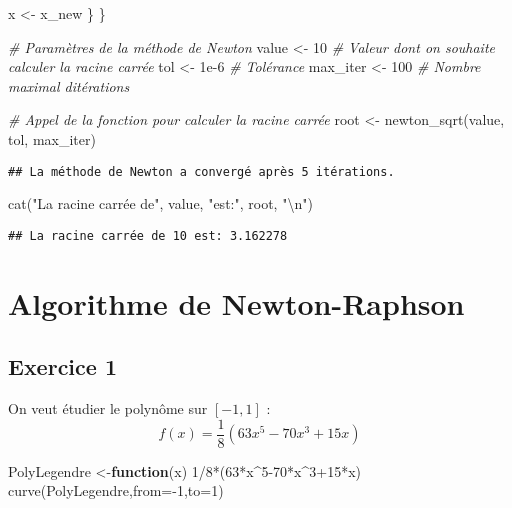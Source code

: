 \documentclass[
]{article}
\newenvironment{Shaded}{\begin{snugshade}}{\end{snugshade}}
\newcommand{\AttributeTok}[1]{\textcolor[rgb]{0.77,0.63,0.00}{#1}}
\newcommand{\CommentTok}[1]{\textcolor[rgb]{0.56,0.35,0.01}{\textit{#1}}}
\newcommand{\ControlFlowTok}[1]{\textcolor[rgb]{0.13,0.29,0.53}{\textbf{#1}}}
\newcommand{\DecValTok}[1]{\textcolor[rgb]{0.00,0.00,0.81}{#1}}
\newcommand{\FloatTok}[1]{\textcolor[rgb]{0.00,0.00,0.81}{#1}}
\newcommand{\FunctionTok}[1]{\textcolor[rgb]{0.00,0.00,0.00}{#1}}
\newcommand{\NormalTok}[1]{#1}
\newcommand{\OtherTok}[1]{\textcolor[rgb]{0.56,0.35,0.01}{#1}}
\newcommand{\SpecialCharTok}[1]{\textcolor[rgb]{0.00,0.00,0.00}{#1}}
\newcommand{\StringTok}[1]{\textcolor[rgb]{0.31,0.60,0.02}{#1}}
\begin{document}
\begin{Shaded}
\begin{Highlighting}[]
\NormalTok{    x }\OtherTok{\textless{}{-}}\NormalTok{ x\_new}
\NormalTok{  \}}
\NormalTok{\}}

\CommentTok{\# Paramètres de la méthode de Newton}
\NormalTok{value }\OtherTok{\textless{}{-}} \DecValTok{10}  \CommentTok{\# Valeur dont on souhaite calculer la racine carrée}
\NormalTok{tol }\OtherTok{\textless{}{-}} \FloatTok{1e{-}6}  \CommentTok{\# Tolérance}
\NormalTok{max\_iter }\OtherTok{\textless{}{-}} \DecValTok{100}  \CommentTok{\# Nombre maximal d\textquotesingle{}itérations}

\CommentTok{\# Appel de la fonction pour calculer la racine carrée}
\NormalTok{root }\OtherTok{\textless{}{-}} \FunctionTok{newton\_sqrt}\NormalTok{(value, tol, max\_iter)}
\end{Highlighting}
\end{Shaded}

\begin{verbatim}
## La méthode de Newton a convergé après 5 itérations.
\end{verbatim}

\begin{Shaded}
\begin{Highlighting}[]
\FunctionTok{cat}\NormalTok{(}\StringTok{"La racine carrée de"}\NormalTok{, value, }\StringTok{"est:"}\NormalTok{, root, }\StringTok{"}\SpecialCharTok{\textbackslash{}n}\StringTok{"}\NormalTok{)}
\end{Highlighting}
\end{Shaded}

\begin{verbatim}
## La racine carrée de 10 est: 3.162278
\end{verbatim}

\hypertarget{algorithme-de-newton-raphson}{%
\section{Algorithme de
Newton-Raphson}\label{algorithme-de-newton-raphson}}

\hypertarget{exercice-1}{%
\subsection{Exercice 1}\label{exercice-1}}

On veut étudier le polynôme sur \([-1,1]\) : \[
f(x) = \frac18 (63x^5 - 70x^3 + 15x)
\]

\begin{Shaded}
\begin{Highlighting}[]
\NormalTok{PolyLegendre }\OtherTok{\textless{}{-}}\ControlFlowTok{function}\NormalTok{(x) }\DecValTok{1}\SpecialCharTok{/}\DecValTok{8}\SpecialCharTok{*}\NormalTok{(}\DecValTok{63}\SpecialCharTok{*}\NormalTok{x}\SpecialCharTok{\^{}}\DecValTok{5{-}70}\SpecialCharTok{*}\NormalTok{x}\SpecialCharTok{\^{}}\DecValTok{3}\SpecialCharTok{+}\DecValTok{15}\SpecialCharTok{*}\NormalTok{x)}
\FunctionTok{curve}\NormalTok{(PolyLegendre,}\AttributeTok{from=}\SpecialCharTok{{-}}\DecValTok{1}\NormalTok{,}\AttributeTok{to=}\DecValTok{1}\NormalTok{)}
\end{Highlighting}
\end{Shaded}
\end{document}
